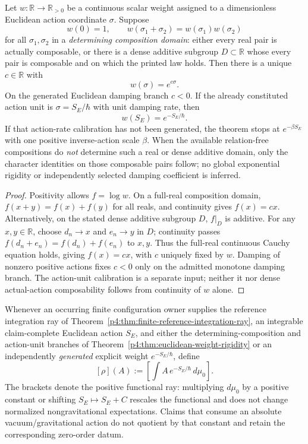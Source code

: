 \documentclass[12pt,a4paper]{article}
\begin{document}
\begin{theorem}
\label{p4:thm:euclidean-weight-rigidity}
Let $w:\mathbb R\to\mathbb R_{>0}$ be a continuous scalar weight assigned to
a dimensionless Euclidean action coordinate $\sigma$.  Suppose
\[
 w(0)=1,
 \qquad
 w(\sigma_1+\sigma_2)=w(\sigma_1)w(\sigma_2)
\]
for all $\sigma_1,\sigma_2$ in a \emph{determining composition domain}:
either every real pair is actually composable, or there is a dense additive
subgroup $D\subset\mathbb R$ whose every pair is composable and on which the
printed law holds.  Then there is a unique $c\in\mathbb R$ with
\[
 \boxed{w(\sigma)=e^{c\sigma}}.
\]
On the generated Euclidean damping branch $c<0$.  If the already constituted
action unit is $\sigma=S_E/\hbar$ with unit damping rate, then
\[
 \boxed{w(S_E)=e^{-S_E/\hbar}}.
\]
If that action-rate calibration has not been generated, the theorem stops at
$e^{-\beta S_E}$ with one positive inverse-action scale $\beta$.
When the available relation-free compositions do \emph{not} determine such a
real or dense additive domain, only the character identities on those
composable pairs follow; no global exponential rigidity or independently
selected damping coefficient is inferred.
\end{theorem}

\begin{proof}
Positivity allows $f=\log w$.  On a full-real composition domain,
$f(x+y)=f(x)+f(y)$ for all reals, and continuity gives $f(x)=cx$.
Alternatively, on the stated dense additive subgroup $D$, $f|_D$ is
additive.  For any $x,y\in\mathbb R$, choose $d_n\to x$ and $e_n\to y$
in $D$; continuity passes $f(d_n+e_n)=f(d_n)+f(e_n)$ to $x,y$.
Thus the full-real continuous Cauchy equation holds, giving $f(x)=cx$,
with $c$ uniquely fixed by $w$.  Damping of nonzero positive actions fixes
$c<0$ only on the admitted monotone damping branch.  The action-unit
calibration is a separate input; neither it nor dense actual-action
composability follows from continuity of $w$ alone.
\end{proof}

\begin{definition}
\label{p4:def:generated-finite-euclidean-quantum-ray}
Whenever an occurring finite configuration owner supplies the reference
integration ray of Theorem~\ref{p4:thm:finite-reference-integration-ray}, an
integrable claim-complete Euclidean action $S_E$, and either the determining-composition and action-unit branches of
Theorem~\ref{p4:thm:euclidean-weight-rigidity} or an independently
\emph{generated} explicit weight $e^{-S_E/\hbar}$, define
\[
 \boxed{
 [\rho](A)
 :=\left[
   \int A\,e^{-S_E/\hbar}\,d\mu_0
 \right].}
\]
The brackets denote the positive functional ray: multiplying $d\mu_0$ by a
positive constant or shifting $S_E\mapsto S_E+C$ rescales the functional and
does not change normalized nongravitational expectations.  Claims that
consume an absolute vacuum/gravitational action do not quotient by that
constant and retain the corresponding zero-order datum.
\end{definition}
\end{document}
